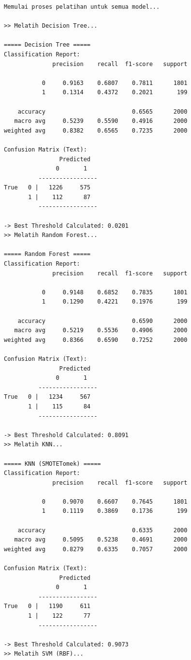 \begin{lstlisting}[caption={Output 5}]
Memulai proses pelatihan untuk semua model...

>> Melatih Decision Tree...

===== Decision Tree =====
Classification Report:
              precision    recall  f1-score   support

           0     0.9163    0.6807    0.7811      1801
           1     0.1314    0.4372    0.2021       199

    accuracy                         0.6565      2000
   macro avg     0.5239    0.5590    0.4916      2000
weighted avg     0.8382    0.6565    0.7235      2000

Confusion Matrix (Text):
                Predicted
               0       1
          -----------------
True   0 |   1226     575
       1 |    112      87
          -----------------

-> Best Threshold Calculated: 0.0201
>> Melatih Random Forest...

===== Random Forest =====
Classification Report:
              precision    recall  f1-score   support

           0     0.9148    0.6852    0.7835      1801
           1     0.1290    0.4221    0.1976       199

    accuracy                         0.6590      2000
   macro avg     0.5219    0.5536    0.4906      2000
weighted avg     0.8366    0.6590    0.7252      2000

Confusion Matrix (Text):
                Predicted
               0       1
          -----------------
True   0 |   1234     567
       1 |    115      84
          -----------------

-> Best Threshold Calculated: 0.8091
>> Melatih KNN...

===== KNN (SMOTETomek) =====
Classification Report:
              precision    recall  f1-score   support

           0     0.9070    0.6607    0.7645      1801
           1     0.1119    0.3869    0.1736       199

    accuracy                         0.6335      2000
   macro avg     0.5095    0.5238    0.4691      2000
weighted avg     0.8279    0.6335    0.7057      2000

Confusion Matrix (Text):
                Predicted
               0       1
          -----------------
True   0 |   1190     611
       1 |    122      77
          -----------------

-> Best Threshold Calculated: 0.9073
>> Melatih SVM (RBF)...


\end{lstlisting}
